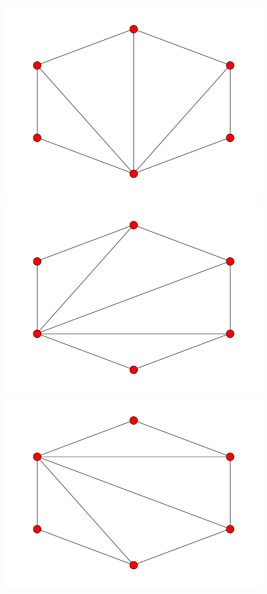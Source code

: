 \documentclass[fontsize=10pt]{article}
\begin{document}
\begin{enumerate}
\begin{figure}[hbtp]
\includegraphics[scale=0.1]{imgs/hexagon/hexagon_4.png}
\includegraphics[scale=0.1]{imgs/hexagon/hexagon_5.png}
\includegraphics[scale=0.1]{imgs/hexagon/hexagon_6.png}

\end{figure}
\end{enumerate}
\end{document}
